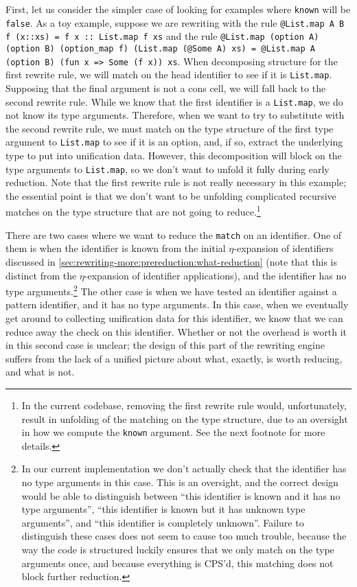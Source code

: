 First, let us consider the simpler case of looking for examples where \texttt{known} will be \texttt{false}.
As a toy example, suppose we are rewriting with the rule \texttt{@List.map A B f (x::xs) = f x :: List.map f xs} and the rule \texttt{@List.map (option A) (option B) (option_map f) (List.map (@Some A) xs) = @List.map A (option B) (fun x => Some (f x)) xs}.
When decomposing structure for the first rewrite rule, we will match on the head identifier to see if it is \texttt{List.map}.
Supposing that the final argument is not a cons cell, we will fall back to the second rewrite rule.
While we know that the first identifier is a \texttt{List.map}, we do not know its type arguments.
Therefore, when we want to try to substitute with the second rewrite rule, we must match on the type structure of the first type argument to \texttt{List.map} to see if it is an option, and, if so, extract the underlying type to put into unification data.
However, this decomposition will block on the type arguments to \texttt{List.map}, so we don't want to unfold it fully during early reduction.
Note that the first rewrite rule is not really necessary in this example; the essential point is that we don't want to be unfolding complicated recursive matches on the type structure that are not going to reduce.\footnote{%
  In the current codebase, removing the first rewrite rule would, unfortunately, result in unfolding of the matching on the type structure, due to an oversight in how we compute the \texttt{known} argument.
  See the next footnote for more details.%
}

There are two cases where we want to reduce the \texttt{match} on an identifier.
One of them is when the identifier is known from the initial $\eta$-expansion of identifiers discussed in \autoref{sec:rewriting-more:prereduction:what-reduction} (note that this is distinct from the $\eta$-expansion of identifier applications), and the identifier has no type arguments.\footnote{%
  In our current implementation we don't actually check that the identifier has no type arguments in this case.
  This is an oversight, and the correct design would be able to distinguish between ``this identifier is known and it has no type arguments'', ``this identifier is known but it has unknown type arguments'', and ``this identifier is completely unknown''.
  Failure to distinguish these cases does not seem to cause too much trouble, because the way the code is structured luckily ensures that we only match on the type arguments once, and because everything is CPS'd, this matching does not block further reduction.%
}
The other case is when we have tested an identifier against a pattern identifier, and it has no type arguments.
In this case, when we eventually get around to collecting unification data for this identifier, we know that we can reduce away the check on this identifier.
Whether or not the overhead is worth it in this second case is unclear; the design of this part of the rewriting engine suffers from the lack of a unified picture about what, exactly, is worth reducing, and what is not.

